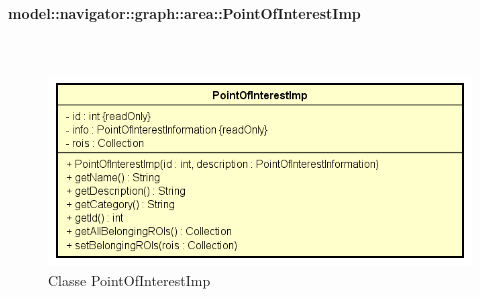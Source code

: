 \documentclass[../DefinizioneDiProdotto.tex]{subfiles}
\begin{document}
\paragraph{model::navigator::graph::area::PointOfInterestImp}
\
\begin{figure}[H]
	\centering
	\includegraphics[width=\maxwidth]{img/PointOfInterestImp.png}
	\caption{Classe PointOfInterestImp}\label{fig:model::navigator::graph::area::PointOfInterestImp} 
\end{figure}
\end{document}
